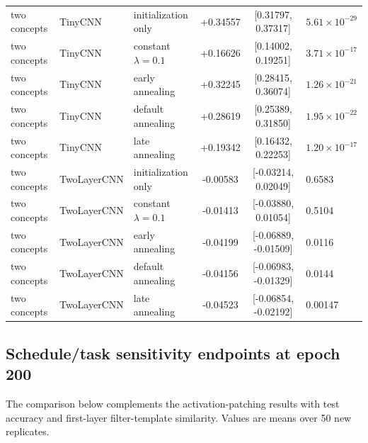 {\begin{longtable}{lllccl}
two concepts & TinyCNN & initialization only & +0.34557 & [0.31797, 0.37317] & $5.61\times10^{-29}$ \\
two concepts & TinyCNN & constant $\lambda=0.1$ & +0.16626 & [0.14002, 0.19251] & $3.71\times10^{-17}$ \\
two concepts & TinyCNN & early annealing & +0.32245 & [0.28415, 0.36074] & $1.26\times10^{-21}$ \\
two concepts & TinyCNN & default annealing & +0.28619 & [0.25389, 0.31850] & $1.95\times10^{-22}$ \\
two concepts & TinyCNN & late annealing & +0.19342 & [0.16432, 0.22253] & $1.20\times10^{-17}$ \\
two concepts & TwoLayerCNN & initialization only & -0.00583 & [-0.03214, 0.02049] & 0.6583 \\
two concepts & TwoLayerCNN & constant $\lambda=0.1$ & -0.01413 & [-0.03880, 0.01054] & 0.5104 \\
two concepts & TwoLayerCNN & early annealing & -0.04199 & [-0.06889, -0.01509] & 0.0116 \\
two concepts & TwoLayerCNN & default annealing & -0.04156 & [-0.06983, -0.01329] & 0.0144 \\
two concepts & TwoLayerCNN & late annealing & -0.04523 & [-0.06854, -0.02192] & 0.00147 \\
\end{longtable}
\normalsize
}

\subsection{Schedule/task sensitivity endpoints at epoch 200}\label{app:schedule-endpoints}

The comparison below complements the activation-patching results with test accuracy and first-layer filter-template similarity. Values are means over 50 new replicates.

